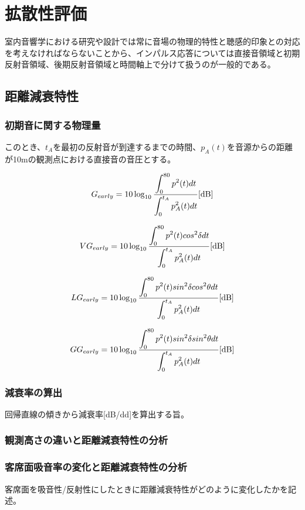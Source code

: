 \chapter{拡散性評価}
室内音響学における研究や設計では常に音場の物理的特性と聴感的印象との対応を考えなければならないことから、インパルス応答については直接音領域と初期反射音領域、後期反射音領域と時間軸上で分けて扱うのが一般的である。
\section{距離減衰特性}
\subsection{初期音に関する物理量}

このとき、$t_A$を最初の反射音が到達するまでの時間、$p_A(t)$を音源からの距離が10mの観測点における直接音の音圧とする。

\begin{equation}
  \label{eq:}
  G_{early} = 10\log_{10}{\frac{\displaystyle\int_0^{80}p^2(t)dt}{\displaystyle\int_0^{t_A}p_{A}^2(t)dt}} \textrm{[dB]}
\end{equation}

\begin{equation}
  \label{eq:}
  VG_{early} = 10\log_{10}{\frac{\displaystyle\int_0^{80}p^2(t)cos^2{\delta}dt}{\displaystyle\int_0^{t_A}p_{A}^2(t)dt}} \textrm{[dB]}
\end{equation}

\begin{equation}
  \label{eq:}
  LG_{early} = 10\log_{10}{\frac{\displaystyle\int_0^{80}p^2(t)sin^2{\delta}cos^2{\theta}dt}{\displaystyle\int_0^{t_A}p_{A}^2(t)dt}} \textrm{[dB]}
\end{equation}

\begin{equation}
  \label{eq:}
  GG_{early} = 10\log_{10}{\frac{\displaystyle\int_0^{80}p^2(t)sin^2{\delta}sin^2{\theta}dt}{\displaystyle\int_0^{t_A}p_{A}^2(t)dt}} \textrm{[dB]}
\end{equation}

\subsection{減衰率の算出}
回帰直線の傾きから減衰率[dB/dd]を算出する旨。
\subsection{観測高さの違いと距離減衰特性の分析}
\subsection{客席面吸音率の変化と距離減衰特性の分析}
客席面を吸音性/反射性にしたときに距離減衰特性がどのように変化したかを記述。
